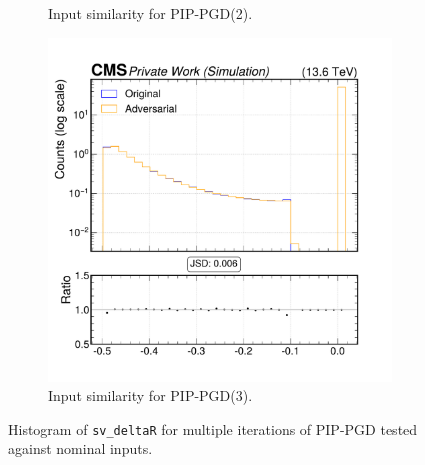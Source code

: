 \begin{figure}[h]
\begin{subfigure}[t]{0.32\textwidth}
    \caption*{Input similarity for PIP-PGD(2).}
  \end{subfigure}\hfill
  \begin{subfigure}[t]{0.32\textwidth}
    \includegraphics[width=\linewidth]{media/output/features/compare/combined_it_3/cmp_vtx_arr_sv_deltaR.pdf}
    \caption*{Input similarity for PIP-PGD(3).}
  \end{subfigure}

  \caption*{Histogram of \texttt{sv\_deltaR} for multiple iterations of PIP-PGD tested against nominal inputs.}
  \label{fig:combined_input_sv_deltaR}
\end{figure}

